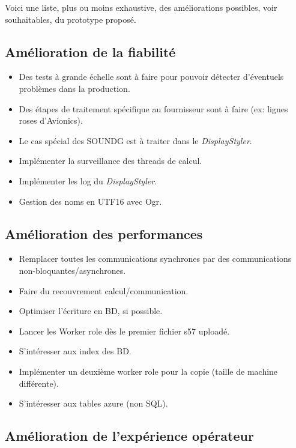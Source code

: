 
Voici une liste, plus ou moins exhaustive, des améliorations
possibles, voir souhaitables, du prototype proposé.


\subsection{Amélioration de la fiabilité}

\begin{itemize}
\item[] Des tests à grande échelle sont à faire pour pouvoir détecter
  d'éventuels problèmes dans la production. 
\item[] Des étapes de traitement spécifique au fournisseur sont à
  faire (ex: lignes roses d'Avionics).
\item[] Le cas spécial des SOUNDG est à traiter dans le
  \textit{DisplayStyler}.
\item[] Implémenter la surveillance des threads de calcul.
\item[] Implémenter les log du \textit{DisplayStyler}.
\item[] Gestion des noms en UTF16 avec Ogr.
\end{itemize}

\subsection{Amélioration des performances}

\begin{itemize}
\item[] Remplacer toutes les communications synchrones par des
  communications non-bloquantes/asynchrones.
\item[] Faire du recouvrement calcul/communication.
\item[] Optimiser l'écriture en BD, si possible.
\item[] Lancer les Worker role dès le premier fichier s57 uploadé.
\item[] S'intéresser aux index des BD.
\item[] Implémenter un deuxième worker role pour la copie (taille de
  machine différente).
\item[] S'intéresser aux tables azure (non SQL).
\end{itemize}

\subsection{Amélioration de l'expérience opérateur}

